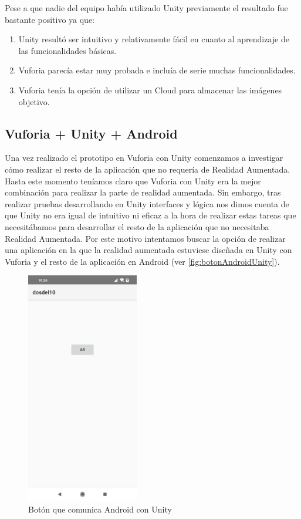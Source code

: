 Pese a que nadie del equipo había utilizado Unity previamente el resultado fue bastante positivo ya que:
\begin{enumerate}
    \item Unity resultó ser intuitivo y relativamente fácil en cuanto al aprendizaje de las funcionalidades básicas.
    \item Vuforia parecía estar muy probada e incluía de serie muchas funcionalidades.
    \item Vuforia tenía la opción de utilizar un Cloud para almacenar las imágenes objetivo.
\end{enumerate}


\subsection{Vuforia + Unity + Android} 
\label{makereference4.1.5}

Una vez realizado el prototipo en Vuforia con Unity comenzamos a investigar cómo realizar el resto de la aplicación que no requería de Realidad Aumentada.
Hasta este momento teníamos claro que Vuforia con Unity era la mejor combinación para realizar la parte de realidad aumentada. Sin embargo, tras realizar pruebas desarrollando en Unity interfaces y lógica nos dimos cuenta de que Unity no era igual de intuitivo ni eficaz a la hora de realizar estas tareas que necesitábamos para desarrollar el resto de la aplicación que no necesitaba Realidad Aumentada.
Por este motivo intentamos buscar la opción de realizar una aplicación en la que la realidad aumentada estuviese diseñada en Unity con Vuforia y el resto de la aplicación en Android (ver \autoref{fig:botonAndroidUnity}).

\begin{figure}[H]
    \centering
    \includegraphics[height=4in]{figures/androidUnityVuforia.jpg}
    \caption{Botón que comunica Android con Unity}
    \label{fig:botonAndroidUnity}
\end{figure}

